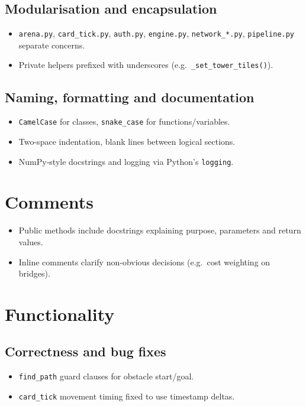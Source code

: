 \documentclass[11pt,a4paper]{article}
\begin{document}
\subsection{Modularisation and encapsulation}
\begin{itemize}[nosep]
  \item \texttt{arena.py}, \texttt{card\_tick.py}, \texttt{auth.py}, \texttt{engine.py}, \texttt{network\_*.py}, \texttt{pipeline.py} separate concerns.
  \item Private helpers prefixed with underscores (e.g.\ \texttt{\_set\_tower\_tiles()}).
\end{itemize}

\subsection{Naming, formatting and documentation}
\begin{itemize}[nosep]
  \item \texttt{CamelCase} for classes, \texttt{snake\_case} for functions/variables.
  \item Two-space indentation, blank lines between logical sections.
  \item NumPy‐style docstrings and logging via Python’s \texttt{logging}.
\end{itemize}

\section{Comments}
\begin{itemize}[nosep]
  \item Public methods include docstrings explaining purpose, parameters and return values.
  \item Inline comments clarify non‐obvious decisions (e.g.\ cost weighting on bridges).
\end{itemize}

\section{Functionality}
\subsection{Correctness and bug fixes}
\begin{itemize}[nosep]
  \item \texttt{find\_path} guard clauses for obstacle start/goal.
  \item \texttt{card\_tick} movement timing fixed to use timestamp deltas. 
\end{itemize}
\end{document}
